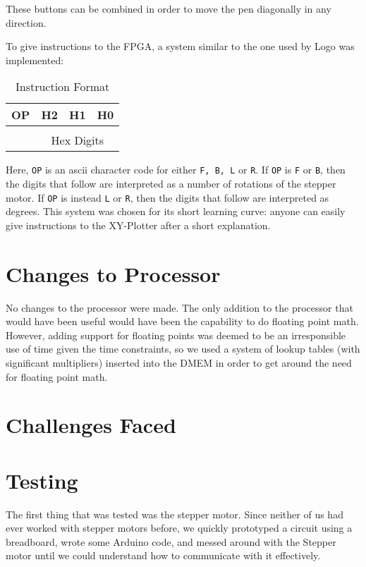 \documentclass[12pt]{article}
\begin{document}
These buttons can be combined in order to move the pen diagonally in any direction.

To give instructions to the FPGA, a system similar to the one used by Logo was implemented:

\begin{table}[ht!]
\centering
\begin{tabular}{|c|c|c|c|} \hline
OP & H2 & H1 & H0 \\ \hline
\multicolumn{1}{c}{} & \multicolumn{3}{p{2cm}}{\raisebox{.5\baselineskip}{$\underbrace{\hspace{2.45cm}}$}} \\
\multicolumn{1}{c}{} & \multicolumn{3}{c}{Hex Digits} \\
\end{tabular}
\caption{Instruction Format}
\end{table}

Here, {\tt OP} is an ascii character code for either {\tt F, B, L} or {\tt R}. If {\tt OP} is {\tt F} or {\tt B}, then the digits that follow are interpreted as a number of rotations of the stepper motor. If {\tt OP} is instead {\tt L} or {\tt R}, then the digits that follow are interpreted as degrees. This system was chosen for its short learning curve: anyone can easily give instructions to the XY-Plotter after a short explanation.

\section{Changes to Processor}
No changes to the processor were made. The only addition to the processor that would have been useful would have been the capability to do floating point math. However, adding support for floating points was deemed to be an irresponsible use of time given the time constraints, so we used a system of lookup tables (with significant multipliers) inserted into the DMEM in order to get around the need for floating point math.

\section{Challenges Faced}



\section{Testing}
The first thing that was tested was the stepper motor. Since neither of us had ever worked with stepper motors before, we quickly prototyped a circuit using a breadboard, wrote some Arduino code, and messed around with the Stepper motor until we could understand how to communicate with it effectively. 
\end{document}
